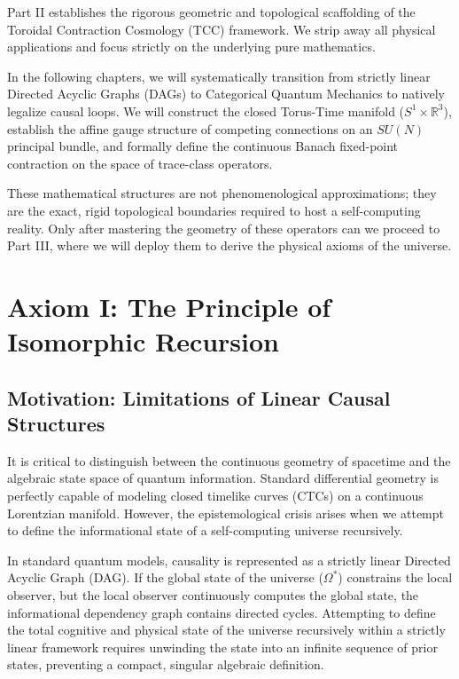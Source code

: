 \documentclass[12pt,openany]{book}
\theoremstyle{plain}
\theoremstyle{definition}
\theoremstyle{remark}
\begin{document}
Part II establishes the rigorous geometric and topological scaffolding of the Toroidal Contraction Cosmology (TCC) framework. We strip away all physical applications and focus strictly on the underlying pure mathematics.

In the following chapters, we will systematically transition from strictly linear Directed Acyclic Graphs (DAGs) to Categorical Quantum Mechanics to natively legalize causal loops. We will construct the closed Torus-Time manifold ($S^1 \times \mathbb{R}^3$), establish the affine gauge structure of competing connections on an $SU(N)$ principal bundle, and formally define the continuous Banach fixed-point contraction on the space of trace-class operators.

These mathematical structures are not phenomenological approximations; they are the exact, rigid topological boundaries required to host a self-computing reality. Only after mastering the geometry of these operators can we proceed to Part III, where we will deploy them to derive the physical axioms of the universe.

\chapter{Axiom I: The Principle of Isomorphic Recursion}

\section{Motivation: Limitations of Linear Causal Structures}

It is critical to distinguish between the continuous geometry of spacetime and the algebraic state space of quantum information. Standard differential geometry is perfectly capable of modeling closed timelike curves (CTCs) on a continuous Lorentzian manifold. However, the epistemological crisis arises when we attempt to define the informational state of a self-computing universe recursively.

In standard quantum models, causality is represented as a strictly linear Directed Acyclic Graph (DAG). If the global state of the universe ($\Omega^*$) constrains the local observer, but the local observer continuously computes the global state, the informational dependency graph contains directed cycles. Attempting to define the total cognitive and physical state of the universe recursively within a strictly linear framework requires unwinding the state into an infinite sequence of prior states, preventing a compact, singular algebraic definition.
\end{document}

